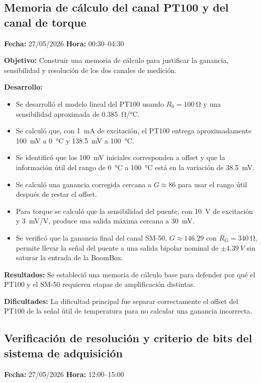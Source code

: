 \documentclass[12pt]{article}
\begin{document}
\subsection{Memoria de cálculo del canal PT100 y del canal de torque}
\textbf{Fecha:} 27/05/2026 \quad \textbf{Hora:} 00:30--04:30

\textbf{Objetivo:}
Construir una memoria de cálculo para justificar la ganancia, sensibilidad y resolución de los dos canales de medición.

\textbf{Desarrollo:}
\begin{itemize}
\item Se desarrolló el modelo lineal del PT100 usando \(R_0=\SI{100}{\ohm}\) y una sensibilidad aproximada de \SI{0.385}{\ohm/\celsius}.
\item Se calculó que, con \SI{1}{mA} de excitación, el PT100 entrega aproximadamente \SI{100}{mV} a \SI{0}{\celsius} y \SI{138.5}{mV} a \SI{100}{\celsius}.
\item Se identificó que los \SI{100}{mV} iniciales corresponden a offset y que la información útil del rango de \SI{0}{\celsius} a \SI{100}{\celsius} está en la variación de \SI{38.5}{mV}.
\item Se calculó una ganancia corregida cercana a \(G\approx 86\) para usar el rango útil después de restar el offset.
\item Para torque se calculó que la sensibilidad del puente, con \SI{10}{V} de excitación y \SI{3}{mV/V}, produce una salida máxima cercana a \SI{30}{mV}.
\item Se verificó que la ganancia final del canal SM-50, \(G\approx 146.29\) con \(R_G=\SI{340}{\ohm}\), permite llevar la señal del puente a una salida bipolar nominal de \(\pm\SI{4.39}{V}\) sin saturar la entrada de la BoomBox.
\end{itemize}

\textbf{Resultados:}
Se estableció una memoria de cálculo base para defender por qué el PT100 y el SM-50 requieren etapas de amplificación distintas.

\textbf{Dificultades:}
La dificultad principal fue separar correctamente el offset del PT100 de la señal útil de temperatura para no calcular una ganancia incorrecta.

\subsection{Verificación de resolución y criterio de bits del sistema de adquisición}
\textbf{Fecha:} 27/05/2026 \quad \textbf{Hora:} 12:00--15:00
\end{document}
